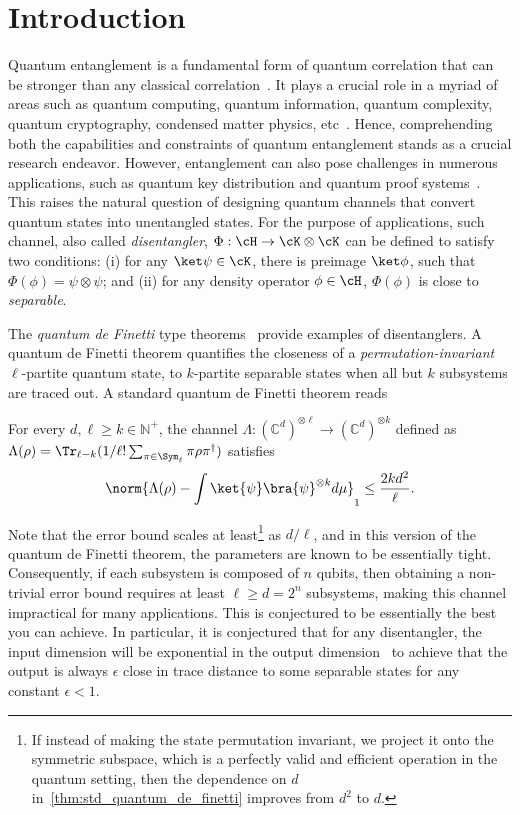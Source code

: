 \section{Introduction}

Quantum entanglement is a fundamental form of quantum correlation that
can be stronger than any classical correlation~\cite{EPR35, B64,CHSH69,JNVWY20}.
%
It plays a crucial role in a myriad of areas such as quantum computing, quantum information,
quantum complexity, quantum cryptography, condensed matter physics, etc~\cite{HHHH09,NC10,Watrous18}.
%
Hence, comprehending both the capabilities and constraints of quantum entanglement stands
as a crucial research endeavor.
%
However, entanglement can also pose challenges in numerous applications, such as quantum
key distribution and quantum proof systems~\cite{Renner08,KMY03,OW16,HHJWY17}.
%
This raises the natural question of designing quantum channels that convert quantum states
into unentangled states. 
%
For the purpose of applications, such channel, also called \emph{disentangler}, $\Phi: \cH \to \cK\otimes\cK$ can be defined to satisfy two
conditions: (i) for any $\ket\psi\in\cK$, there is preimage $\ket\phi$, such that $\Phi(\phi)=\psi\otimes\psi$;
and (ii) for any density operator $\phi\in \cH$, $\Phi(\phi)$ is close to \emph{separable}. 

The \emph{quantum de Finetti} type theorems~\cite{christandl2007one,KR05,Renner08} provide examples of
disentanglers.
%
A quantum de Finetti theorem quantifies the closeness of a \emph{permutation-invariant} $\ell$-partite
quantum state, to $k$-partite separable states when all but $k$ subsystems are traced out.
%
A standard quantum de Finetti theorem reads
\begin{theorem}\label{thm:std_quantum_de_finetti}
  For every $d,\ell\ge k \in \mathbb{N}^+$, the channel $\Lambda \colon (\mathbb{C}^{d})^{\otimes \ell} \to (\mathbb{C}^d)^{\otimes k}$
  defined as $\Lambda(\rho) = \Tr_{\ell-k}(1/\ell! \sum_{\pi \in \Sym_\ell} \pi \rho \pi^{\dag})$ satisfies
  \begin{align*}
    \norm{\Lambda(\rho) - \int \ket{\psi}\bra{\psi}^{\otimes k} d\mu}_1 \le \frac{2 k d^2}{\ell}.
  \end{align*}
\end{theorem}
Note that the error bound scales at least\footnote{If instead of making the state permutation invariant,
we project it onto the symmetric subspace, which is a perfectly valid and efficient operation in the
quantum setting, then the dependence on $d$ in~\cref{thm:std_quantum_de_finetti} improves from $d^2$ to $d$.}
as $d/\ell$, and in this version of the quantum de Finetti theorem, the parameters are known to be essentially
tight.
%
Consequently, if each subsystem is composed of $n$ qubits, then obtaining
a non-trivial error bound requires at least $\ell \ge d = 2^{n}$
subsystems, making this channel impractical for many applications.
%
This is conjectured to be essentially the best you can achieve. In particular,
it is conjectured that for any disentangler, the input dimension will be
exponential in the output dimension~\cite{ABDFS08} to achieve that the output is always $\epsilon$ close in trace distance to some separable states for any constant $\epsilon<1$. 

